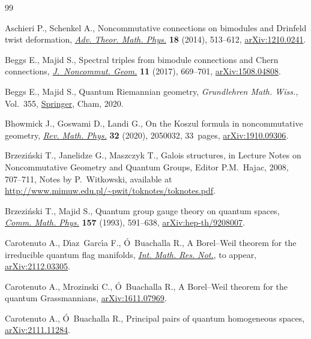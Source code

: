 \begin{thebibliography}{99}
\footnotesize\itemsep=0pt

Aschieri P., Schenkel A., Noncommutative connections on bimodules and
 {D}rinfeld twist deformation, \href{https://doi.org/10.4310/ATMP.2014.v18.n3.a1}{\textit{Adv. Theor. Math. Phys.}} \textbf{18}
 (2014), 513--612, \href{https://arxiv.org/abs/1210.0241}{arXiv:1210.0241}.

Beggs E., Majid S., Spectral triples from bimodule connections and {C}hern
 connections, \href{https://doi.org/10.4171/JNCG/11-2-7}{\textit{J.~Noncommut. Geom.}} \textbf{11} (2017), 669--701,
 \href{https://arxiv.org/abs/1508.04808}{arXiv:1508.04808}.

Beggs E., Majid S., Quantum {R}iemannian geometry, \textit{Grundlehren Math.
 Wiss.}, Vol.~355, \href{https://doi.org/10.1007/978-3-030-30294-8}{Springer}, Cham, 2020.

Bhowmick J., Goswami D., Landi G., On the {K}oszul formula in noncommutative
 geometry, \href{https://doi.org/10.1142/S0129055X20500324}{\textit{Rev. Math. Phys.}} \textbf{32} (2020), 2050032, 33~pages,
 \href{https://arxiv.org/abs/1910.09306}{arXiv:1910.09306}.

Brzezi\'nski T., Janelidze G., Maszczyk T., Galois structures, in Lecture Notes
 on Noncommutative Geometry and Quantum Groups, Editor P.M.~Hajac, 2008,
 707--711, {N}otes by P.~Witkowski, available at
 \url{http://www.mimuw.edu.pl/~pwit/toknotes/toknotes.pdf}.

Brzezi\'nski T., Majid S., Quantum group gauge theory on quantum spaces,
 \href{https://doi.org/10.1007/BF02096884}{\textit{Comm. Math. Phys.}} \textbf{157} (1993), 591--638,
 \href{https://arxiv.org/abs/hep-th/9208007}{arXiv:hep-th/9208007}.

Carotenuto A., D\'{\i}az~Garc\'{\i}a F., \'O~Buachalla R., A {B}orel--{W}eil
 theorem for the irreducible quantum flag manifolds, \href{https://doi.org/10.1093/imrn/rnac193}{\textit{Int. Math. Res.
 Not.}}, {t}o appear, \href{https://arxiv.org/abs/2112.03305}{arXiv:2112.03305}.

Carotenuto A., Mrozinski C., \'O~Buachalla R., A {B}orel--{W}eil theorem for
 the quantum {G}rassmannians, \href{https://arxiv.org/abs/1611.07969}{arXiv:1611.07969}.

Carotenuto A., \'O~Buachalla R., Principal pairs of quantum homogeneous spaces,
 \href{https://arxiv.org/abs/2111.11284}{arXiv:2111.11284}.


\end{thebibliography}
